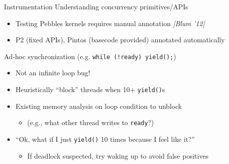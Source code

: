 \documentclass[xcolor=dvipsnames]{beamer}
\begin{document}
\begin{frame}{Instrumentation}
	Understanding concurrency primitives/APIs
	\begin{itemize}
		\item Testing Pebbles kernels requires manual annotation {\em [Blum '12]}
		\item P2 (fixed APIs), Pintos (basecode provided) annotated automatically
	\end{itemize}
	\pause
	\linegap

	Ad-hoc synchronization (e.g. {\tt while (!ready) yield();})
	\begin{itemize}
		\item Not an infinite loop bug!
		\item Heuristically ``block'' threads when 10+ {\tt yield()}s %
		\item Existing memory analysis %
			on loop condition to unblock
			\begin{itemize}
				\item (e.g., what other thread writes to {\tt ready}?)
			\end{itemize}
			\pause
		\item ``Ok, what if I just {\tt yield()} 10 times because I feel like it?''
			\begin{itemize}
				\item If deadlock suspected, try waking up to avoid false positives
			\end{itemize}
	\end{itemize}



\end{frame}

\end{document}
